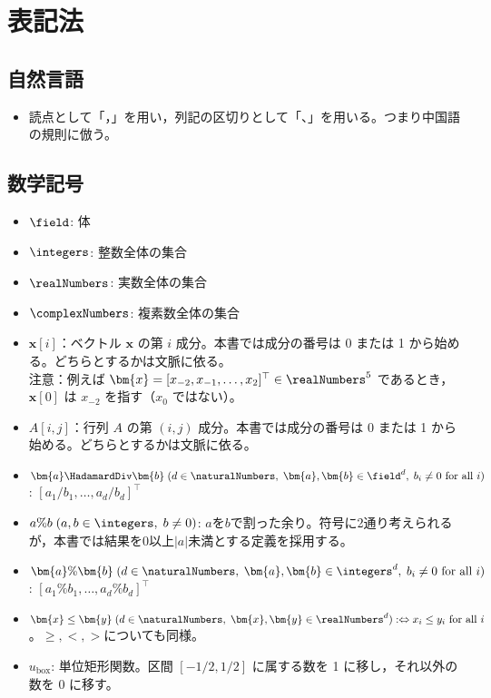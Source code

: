 \part{表記法}
    \chapter{自然言語}
    \begin{itemize}
        \item 読点として「，」を用い，列記の区切りとして「、」を用いる。つまり中国語の規則に倣う。
    \end{itemize}
    \chapter{数学記号}
        \newcommand*{\uBox}{u_\text{box}}
        \begin{itemize}
            \item $\field$: 体
            \item $\integers$: 整数全体の集合
            \item $\realNumbers$: 実数全体の集合
            \item $\complexNumbers$: 複素数全体の集合
            \item $\bm{x}[i]$：ベクトル $\bm{x}$ の第 $i$ 成分。本書では成分の番号は 0 または 1 から始める。どちらとするかは文脈に依る。\\
            注意：例えば $\bm{x} = [x_{-2},x_{-1},\dots,x_2]^\top\in\realNumbers^5$ であるとき，$\bm{x}[0]$ は $x_{-2}$ を指す（$x_0$ ではない）。
            \item $A[i,j]$：行列 $A$ の第 $(i,j)$ 成分。本書では成分の番号は 0 または 1 から始める。どちらとするかは文脈に依る。
            \item $\bm{a} \HadamardDiv \bm{b}\;(d \in \naturalNumbers,\;\bm{a},\bm{b} \in \field^d,\;b_i\neq 0 \text{ for all }i)$: $[a_1/b_1,\dots,a_d/b_d]^\top$
            \item $a\%b\;(a,b\in\integers,\;b\neq 0)$: $a$を$b$で割った余り。符号に2通り考えられるが，本書では結果を0以上$|a|$未満とする定義を採用する。
            \item $\bm{a}\%\bm{b}\;(d\in\naturalNumbers,\;\bm{a},\bm{b} \in \integers^d,\; b_i\neq 0 \text{ for all }i)$: $[a_1\%b_1,\dots,a_d\%b_d]^\top$
            \item $\bm{x} \leq \bm{y}\;(d\in\naturalNumbers,\;\bm{x},\bm{y} \in \realNumbers^d) :\Leftrightarrow x_i \leq y_i \text{ for all }i$。$\geq, <, >$についても同様。
            \item $\uBox$: 単位矩形関数。区間 $[-1/2,1/2]$ に属する数を 1 に移し，それ以外の数を 0 に移す。
        \end{itemize}
